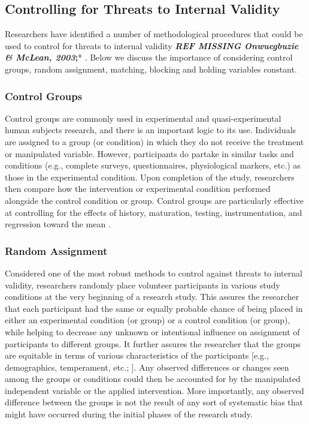 \documentclass[
  11pt,
]{book}
\begin{document}
\subsection{Controlling for Threats to Internal Validity}\label{controlling-for-threats-to-internal-validity}

Researchers have identified a number of methodological procedures that could be used to control for threats to internal validity \citep{campbell_experimental_1963, cook_quasi-experimentation_1979, fabrigar_validity-based_2020, shadish_experimental_2002} \textbf{\emph{REF MISSING Onwuegbuzie \& McLean, 2003};}* . Below we discuss the importance of considering control groups, random assignment, matching, blocking and holding variables constant.

\subsubsection{Control Groups}\label{control-groups}

Control groups are commonly used in experimental and quasi-experimental human subjects research, and there is an important logic to its use. Individuals are assigned to a group (or condition) in which they do not receive the treatment or manipulated variable. However, participants do partake in similar tasks and conditions (e.g., complete surveys, questionnaires, physiological markers, etc.) as those in the experimental condition. Upon completion of the study, researchers then compare how the intervention or experimental condition performed alongside the control condition or group. Control groups are particularly effective at controlling for the effects of history, maturation, testing, instrumentation, and regression toward the mean \citep{campbell_experimental_1963, cook_quasi-experimentation_1979}.

\subsubsection{Random Assignment}\label{random-assignment}

Considered one of the most robust methods to control against threats to internal validity, researchers randomly place volunteer participants in various study conditions at the very beginning of a research study. This assures the researcher that each participant had the same or equally probable chance of being placed in either an experimental condition (or group) or a control condition (or group), while helping to decrease any unknown or intentional influence on assignment of participants to different groups. It further assures the researcher that the groups are equitable in terms of various characteristics of the participants {[}e.g., demographics, temperament, etc.; \citet{fabrigar_validity-based_2020}{]}. Any observed differences or changes seen among the groups or conditions could then be accounted for by the manipulated independent variable or the applied intervention. More importantly, any observed difference between the groups is not the result of any sort of systematic bias that might have occurred during the initial phases of the research study.
\end{document}
